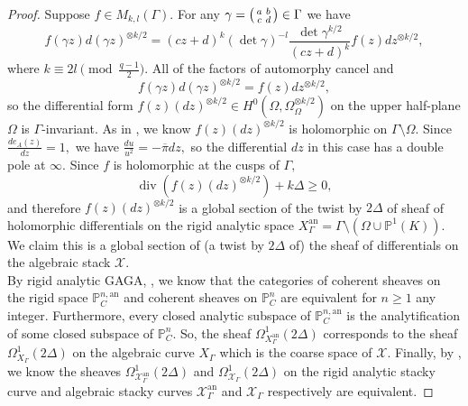\documentclass[11pt]{amsart}
\newtheorem{remark}[theorem]{Remark}
\theoremstyle{definition}
\newenvironment{psmallmatrix}
{\left(\begin{smallmatrix}}
	{\end{smallmatrix}\right)}
\numberwithin{equation}{section}
\newcommand{\cO}{\mathcal{O}}		%
\newcommand{\sX}{\mathscr{X}}		%
\newcommand{\bbP}{\mathbb{P}}		%
\begin{document}
		\begin{proof}
			Suppose $f\in M_{k,l}(\Gamma).$ For any $\displaystyle{\gamma=\begin{psmallmatrix}a&b\\c&d\end{psmallmatrix}\in \Gamma}$ we have \[
			f(\gamma z)d(\gamma z)^{\otimes k/2}= (cz+d)^k(\det\gamma)^{-l}\frac{\det\gamma^{k/2}}{(cz+d)^k} f(z)dz^{\otimes k/2},\] 
			where $k\equiv 2l\pmod{\frac{q-1}{2}}.$ All of the factors of automorphy cancel and \[f(\gamma z)d(\gamma z)^{\otimes k/2}=f(z)dz^{\otimes k/2},\] so the differential form $f(z)(dz)^{\otimes k/2}\in H^0(\Omega,\Omega_{\Omega}^{\otimes k/2})$ on the upper half-plane $\Omega$ is $\Gamma$-invariant. As in \cite[Section $(2.10)$]{Gekeler-jacobians}, we know $f(z)(dz)^{\otimes k/2}$ is holomorphic on $\Gamma\setminus \Omega.$
			Since $\displaystyle{\frac{de_A(z)}{dz}=1},$ we have 
			$\displaystyle{\frac{du}{u^2} = -\overline{\pi}dz,}$ so the differential $dz$ in this case has a double pole at $\infty.$
			Since $f$ is holomorphic at the cusps of $\Gamma,$ 
			\[\operatorname{div}(f(z)(dz)^{\otimes k/2}) +k\Delta\geq 0,\]
			and therefore $f(z)(dz)^{\otimes k/2}$ is a global section of the twist by $2\Delta$ of sheaf of holomorphic differentials on the rigid analytic space $X_{\Gamma}^{\text{an}}=\Gamma\setminus(\Omega\cup\bbP^1(K)).$
			We claim this is a global section of (a twist by $2\Delta$ of) the sheaf of differentials on the algebraic stack $\sX.$\\
			
			By rigid analytic GAGA, \cite[Theorem $4.10.5$]{Frensel-vanderPut-Rigid-Analytic_Geom}, we know that the categories of coherent sheaves on the rigid space $\bbP^{n,\text{an}}_C$ and coherent sheaves on $\bbP^n_C$ are equivalent for $n\geq 1$ any integer. Furthermore, every closed analytic subspace of $\bbP^{n,\text{an}}_C$ is the analytification of some closed subspace of $\bbP^n_C.$ So, the sheaf $\Omega_{X_{\Gamma}^{\text{an}}}^1(2\Delta)$ corresponds to the sheaf $\Omega^1_{X_{\Gamma}}(2\Delta)$ on the algebraic curve $X_{\Gamma}$ which is the coarse space of $\sX.$ Finally, by \cite[Theorem $7.4$]{Porta-Yu-Higher-analytic-stacks-GAGA}, we know the sheaves $\Omega_{\sX_{\Gamma}^{\text{an}}}^1(2\Delta)$ and $\Omega^1_{\sX_{\Gamma}}(2\Delta)$ on the rigid analytic stacky curve and algebraic stacky curves $\sX_{\Gamma}^{\text{an}}$ and $\sX_{\Gamma}$ respectively are equivalent. 
			
			
		\end{proof}
		
\end{document}
